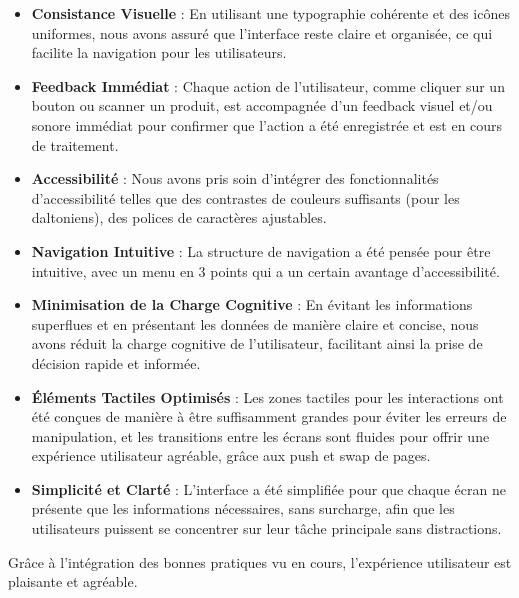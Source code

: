 \begin{itemize}[noitemsep]
    \item \textbf{Consistance Visuelle} : En utilisant une typographie cohérente et des icônes uniformes, nous avons assuré que l'interface reste claire et organisée, ce qui facilite la navigation pour les utilisateurs.
    \item \textbf{Feedback Immédiat} : Chaque action de l'utilisateur, comme cliquer sur un bouton ou scanner un produit, est accompagnée d'un feedback visuel et/ou sonore immédiat pour confirmer que l'action a été enregistrée et est en cours de traitement.
    \item \textbf{Accessibilité} : Nous avons pris soin d'intégrer des fonctionnalités d'accessibilité telles que des contrastes de couleurs suffisants (pour les daltoniens), des polices de caractères ajustables.

    \item \textbf{Navigation Intuitive} : La structure de navigation a été pensée pour être intuitive, avec un menu en 3 points qui a un certain avantage d'accessibilité.

    \item \textbf{Minimisation de la Charge Cognitive} : En évitant les informations superflues et en présentant les données de manière claire et concise, nous avons réduit la charge cognitive de l'utilisateur, facilitant ainsi la prise de décision rapide et informée.

    \item \textbf{Éléments Tactiles Optimisés} : Les zones tactiles pour les interactions ont été conçues de manière à être suffisamment grandes pour éviter les erreurs de manipulation, et les transitions entre les écrans sont fluides pour offrir une expérience utilisateur agréable, grâce aux push et swap de pages.

    \item \textbf{Simplicité et Clarté} : L'interface a été simplifiée pour que chaque écran ne présente que les informations nécessaires, sans surcharge, afin que les utilisateurs puissent se concentrer sur leur tâche principale sans distractions.
\end{itemize}

Grâce à l'intégration des bonnes pratiques vu en cours, l'expérience utilisateur est plaisante et agréable.